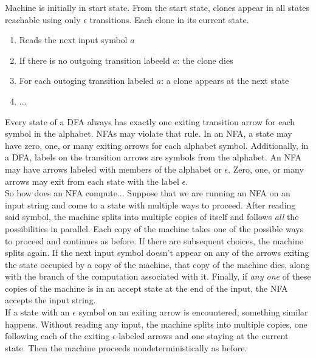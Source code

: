 \documentclass{article}
\begin{document}
Machine is initially in start state. From the start state, clones appear in all states reachable using only $\epsilon$ transitions. Each clone in its current state. 
\begin{enumerate}
  \item Reads the next input symbol $a$ 
  \item If there is no outgoing transition labeeld $a$: the clone dies 
  \item For each outoging transition labeled $a$: a clone appears at the next state 
  \item ...
\end{enumerate}

Every state of a DFA always has exactly one exiting transition arrow for each symbol in the alphabet. NFAs may violate that rule. In an NFA, a state may have zero, one, or many exiting arrows for each alphabet symbol. Additionally, in a DFA, labels on the transition arrows are symbols from the alphabet. An NFA may have arrows labeled with members of the alphabet or $\epsilon$. Zero, one, or many arrows may exit from each state with the label $\epsilon$. \\ 

So how does an NFA compute$\dots$ Suppose that we are running an NFA on an input string and come to a state with multiple ways to proceed. After reading said symbol, the machine splits into multiple copies of itself and follows \emph{all} the possibilities in parallel. Each copy of the machine takes one of the possible ways to proceed and continues as before. If there are subsequent choices, the machine splits again. If the next input symbol doesn't appear on any of the arrows exiting the state occupied by a copy of the machine, that copy of the machine dies, along with the branch of the computation associated with it. Finally, if \emph{any one} of these copies of the machine is in an accept state at the end of the input, the NFA accepts the input string. \\ 

If a state with an $\epsilon$ symbol on an exiting arrow is encountered, something similar happens. Without reading any input, the machine splits into multiple copies, one following each of the exiting $\epsilon$-labeled arrows and one staying at the current state. Then the machine proceeds nondeterministically as before. \\ 
\end{document}
